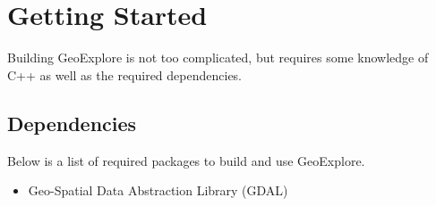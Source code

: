 \documentclass[12pt]{report}
\begin{document}
\section*{Getting Started}

Building GeoExplore is not too complicated, but requires some knowledge
of C++ as well as the required dependencies.

\subsection*{Dependencies}

Below is a list of required packages to build and use GeoExplore.
\begin{itemize}
\item[] Geo-Spatial Data Abstraction Library (GDAL)
\end{itemize}
\end{document}
